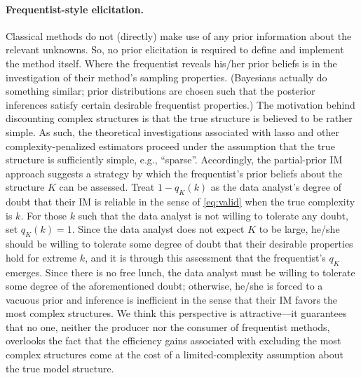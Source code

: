 \documentclass[12pt]{article}
\begin{document}
\paragraph{Frequentist-style elicitation.} 
Classical methods do not (directly) make use of any prior information about the relevant unknowns.  So, no prior elicitation is required to define and implement the method itself.  Where the frequentist reveals his/her prior beliefs is in the investigation of their method's sampling properties.  (Bayesians actually do something similar; prior distributions are chosen such that the posterior inferences satisfy certain desirable frequentist properties.) The motivation behind discounting complex structures is that the true structure is believed to be rather simple.  As such, the theoretical investigations associated with lasso and other complexity-penalized estimators proceed under the assumption that the true structure is sufficiently simple, e.g., ``sparse''.  Accordingly, the partial-prior IM approach suggests a strategy by which the frequentist's prior beliefs about the structure $K$ can be assessed.  Treat $1-q_K(k)$ as the data analyst's degree of doubt that their IM is reliable in the sense of \eqref{eq:valid} when the true complexity is $k$.  For those $k$ such that the data analyst is not willing to tolerate any doubt, set $q_K(k)=1$.  Since the data analyst does not expect $K$ to be large, he/she should be willing to tolerate some degree of doubt that their desirable properties hold for extreme $k$, and it is through this assessment that the frequentist's $q_K$ emerges.  Since there is no free lunch, the data analyst must be willing to tolerate some degree of the aforementioned doubt; otherwise, he/she is forced to a vacuous prior and inference is inefficient in the sense that their IM favors the most complex structures.  We think this perspective is attractive---it guarantees that no one, neither the producer nor the consumer of frequentist methods, overlooks the fact that the efficiency gains associated with excluding the most complex structures come at the cost of a limited-complexity assumption about the true model structure.  

 
\end{document}
